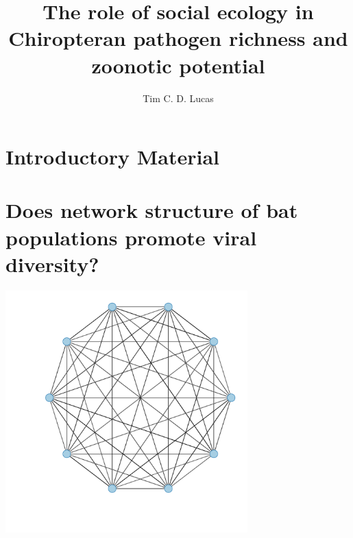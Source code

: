 \documentclass[11pt,phd,a4paper,twoside]{pretty_thesis}
\title{The role of social ecology in Chiropteran pathogen richness and zoonotic potential}
\author{Tim C. D. Lucas}
\begin{document}





\chapter{Introductory Material}
\label{chapterlabel1}


\chapter[Network structure and diversity]{Does network structure of bat populations promote viral diversity?}
\label{chapterlabel2}
\begin{center}
\includegraphics[width=0.7\textwidth]{imgs/fullyConnected.pdf}
\end{center}

\end{document}
